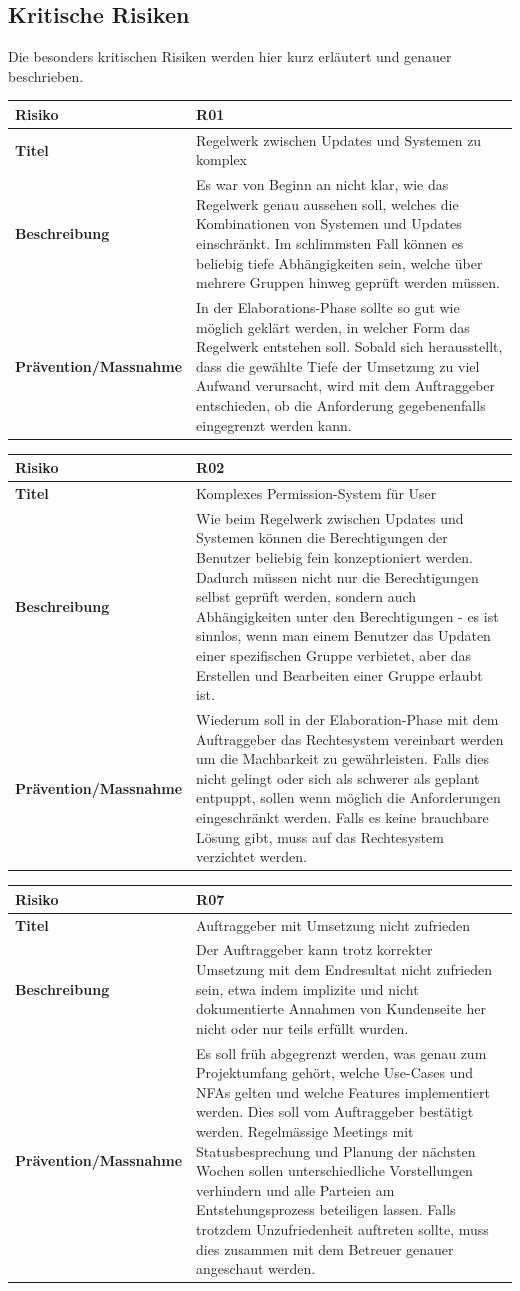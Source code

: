 \subsection*{Kritische Risiken}

Die besonders kritischen Risiken werden hier kurz erläutert und genauer beschrieben.

\newcommand{\projectrisk}[4]{
	\begin{tabularx}{\linewidth}{lX}
		\toprule
		\textbf{Risiko} & #1\\
		\midrule
		\textbf{Titel} & #2\\
		\textbf{Beschreibung} & #3\\
		\textbf{Prävention/Massnahme} & #4\\
		\bottomrule
	\end{tabularx}
}


\projectrisk{R01}{Regelwerk zwischen Updates und Systemen zu komplex}
{Es war von Beginn an nicht klar, wie das Regelwerk genau aussehen soll, welches die Kombinationen von Systemen und Updates einschränkt. Im schlimmsten Fall können es beliebig tiefe Abhängigkeiten sein, welche über mehrere Gruppen hinweg geprüft werden müssen.}
{In der Elaborations-Phase sollte so gut wie möglich geklärt werden, in welcher Form das Regelwerk entstehen soll. Sobald sich herausstellt, dass die gewählte Tiefe der Umsetzung zu viel Aufwand verursacht, wird mit dem Auftraggeber entschieden, ob die Anforderung gegebenenfalls eingegrenzt werden kann.}


\projectrisk{R02}{Komplexes Permission-System für User}
{Wie beim Regelwerk zwischen Updates und Systemen können die Berechtigungen der Benutzer beliebig fein konzeptioniert werden. Dadurch müssen nicht nur die Berechtigungen selbst geprüft werden, sondern auch Abhängigkeiten unter den Berechtigungen - es ist sinnlos, wenn man einem Benutzer das Updaten einer spezifischen Gruppe verbietet, aber das Erstellen und Bearbeiten einer Gruppe erlaubt ist.}
{Wiederum soll in der Elaboration-Phase mit dem Auftraggeber das Rechtesystem vereinbart werden um die Machbarkeit zu gewährleisten. Falls dies nicht gelingt oder sich als schwerer als geplant entpuppt, sollen wenn möglich die Anforderungen eingeschränkt werden. Falls es keine brauchbare Lösung gibt, muss auf das Rechtesystem verzichtet werden.}


\projectrisk{R07}{Auftraggeber mit Umsetzung nicht zufrieden}
{Der Auftraggeber kann trotz korrekter Umsetzung mit dem Endresultat nicht zufrieden sein, etwa indem implizite und nicht dokumentierte Annahmen von Kundenseite her nicht oder nur teils erfüllt wurden.}
{Es soll früh abgegrenzt werden, was genau zum Projektumfang gehört, welche Use-Cases und NFAs gelten und welche Features implementiert werden. Dies soll vom Auftraggeber bestätigt werden. Regelmässige Meetings mit Statusbesprechung und Planung der nächsten Wochen sollen unterschiedliche Vorstellungen verhindern und alle Parteien am Entstehungsprozess beteiligen lassen. Falls trotzdem Unzufriedenheit auftreten sollte, muss dies zusammen mit dem Betreuer genauer angeschaut werden.}

